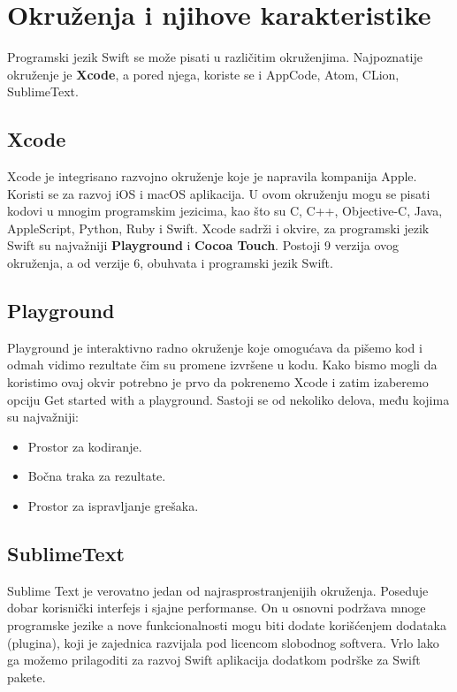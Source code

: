 \documentclass[a4paper]{article}
\begin{document}
\section{Okruženja i njihove karakteristike}	
\label{sec:cetvrtiDeo}
Programski jezik Swift se može pisati u različitim okruženjima. Najpoznatije okruženje je \textbf{Xcode}, a pored njega, koriste se i AppCode, Atom, CLion, SublimeText.

\subsection{Xcode}
\label{subsec:podnaslovXcode}
Xcode  je integrisano razvojno okruženje koje je napravila kompanija Apple. Koristi se za razvoj iOS i macOS aplikacija. U ovom okruženju mogu se pisati kodovi u mnogim programskim jezicima, kao što su C, C++, Objective-C, Java, AppleScript, Python, Ruby i Swift. Xcode sadrži i okvire, za programski jezik Swift su najvažniji \textbf{Playground} i \textbf{Cocoa Touch}. 
Postoji 9 verzija ovog okruženja, a od verzije 6, obuhvata i programski jezik Swift.


\subsection{Playground}
\label{subsec:podnaslovPlayground}
Playground  je interaktivno radno okruženje koje omogućava da pišemo kod i odmah vidimo rezultate čim su promene izvršene u kodu. Kako bismo mogli da koristimo ovaj okvir potrebno je prvo da pokrenemo Xcode i zatim izaberemo opciju Get started with a playground.
Sastoji se od nekoliko delova, među kojima su najvažniji: 
\begin{itemize}
\item Prostor za kodiranje.
\item Bočna traka za rezultate.
\item Prostor za ispravljanje grešaka.
\end{itemize}


\subsection{SublimeText}
\label{subsec:podnaslovSublimeText}

Sublime Text  je verovatno jedan od najrasprostranjenijih okruženja. Poseduje dobar korisnički interfejs i sjajne performanse. On u osnovni podržava mnoge programske jezike a nove funkcionalnosti mogu biti dodate korišćenjem dodataka (plugina), koji je zajednica razvijala pod licencom slobodnog softvera. Vrlo lako ga možemo prilagoditi za razvoj Swift aplikacija dodatkom podrške za Swift pakete.
\end{document}

